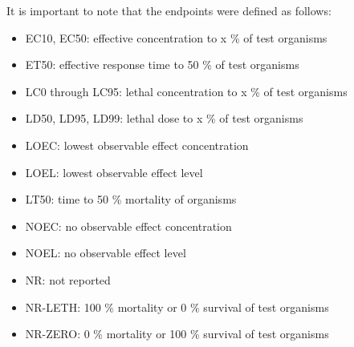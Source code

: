 \documentclass[12pt,]{article}
\providecommand{\tightlist}{%
  \setlength{\itemsep}{0pt}\setlength{\parskip}{0pt}}
\begin{document}
It is important to note that the endpoints were defined as follows:

\begin{itemize}
\tightlist
\item
  EC10, EC50: effective concentration to x \% of test organisms
\item
  ET50: effective response time to 50 \% of test organisms
\item
  LC0 through LC95: lethal concentration to x \% of test organisms
\item
  LD50, LD95, LD99: lethal dose to x \% of test organisms
\item
  LOEC: lowest observable effect concentration
\item
  LOEL: lowest observable effect level
\item
  LT50: time to 50 \% mortality of organisms
\item
  NOEC: no observable effect concentration
\item
  NOEL: no observable effect level
\item
  NR: not reported
\item
  NR-LETH: 100 \% mortality or 0 \% survival of test organisms
\item
  NR-ZERO: 0 \% mortality or 100 \% survival of test organisms
\end{itemize}
\end{document}

